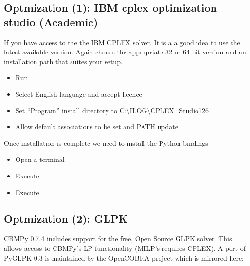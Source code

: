 \documentclass[letterpaper,10pt,english]{sphinxmanual}
\begin{document}
\subsection{Optmization (1): IBM cplex optimization studio (Academic)}
\label{\detokenize{install_doc:optmization-1-ibm-cplex-optimization-studio-academic}}
\sphinxAtStartPar
If you have access to the the IBM CPLEX solver. It is a a good idea to use the latest available version.
Again choose the appropriate 32 or 64 bit version and an installation path that suites your setup.
\begin{itemize}
\item {} 
\sphinxAtStartPar
Run 

\item {} 
\sphinxAtStartPar
Select English language and accept licence

\item {} 
\sphinxAtStartPar
Set “Program” install directory to C:\textbackslash{}ILOG\textbackslash{}CPLEX\_Studio126

\item {} 
\sphinxAtStartPar
Allow default associations to be set and PATH update

\end{itemize}

\sphinxAtStartPar
Once installation is complete we need to install the Python bindings
\begin{itemize}
\item {} 
\sphinxAtStartPar
Open a terminal

\item {} 
\sphinxAtStartPar
Execute 

\item {} 
\sphinxAtStartPar
Execute 

\end{itemize}


\subsection{Optmization (2): GLPK}
\label{\detokenize{install_doc:optmization-2-glpk}}
\sphinxAtStartPar
CBMPy 0.7.4 includes support for the free, Open Source GLPK solver. This allows access
to CBMPy’s LP functionality (MILP’s requires CPLEX). A port of PyGLPK 0.3
is maintained by the OpenCOBRA project which is mirrored here:
\begin{quote}

\sphinxAtStartPar
{}
\end{quote}
\end{document}
